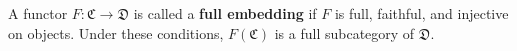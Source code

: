 A functor $F: \mathfrak{C} \to \mathfrak{D}$ is called a \textbf{full embedding} if $F$ is full, faithful, and injective on objects. Under these conditions, $F(\mathfrak{C})$ is a full subcategory of $\mathfrak{D}$.
